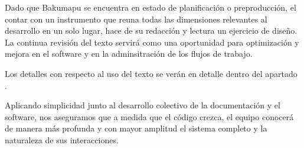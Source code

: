Dado que Bakumapu se encuentra en estado de planificación o preproducción, el contar con un instrumento que reuna todas las dimensiones relevantes al desarrollo en un solo lugar, hace de su redacción y lectura un ejercicio de diseño. La continua revisión del texto servirá como una oportunidad para optimización y mejora en el software y en la adminsitración de los flujos de trabajo.

Los detalles con respecto al uso del texto se verán en detalle dentro del apartado .

Aplicando simplicidad junto al desarrollo colectivo de la documentación y el software, nos aseguramos que a medida que el código crezca, el equipo conocerá de manera más profunda y con mayor amplitud el sistema completo y la naturaleza de sus interacciones.
